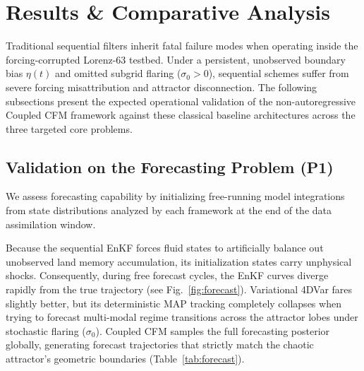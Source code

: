\documentclass[10pt]{article}
\begin{document}
\section{Results \& Comparative Analysis}
Traditional sequential filters inherit fatal failure modes when operating inside the forcing-corrupted Lorenz-63 testbed. Under a persistent, unobserved boundary bias $\eta(t)$ and omitted subgrid flaring ($\sigma_0 > 0$), sequential schemes suffer from severe forcing misattribution and attractor disconnection. The following subsections present the expected operational validation of the non-autoregressive Coupled CFM framework against these classical baseline architectures across the three targeted core problems.

\subsection{Validation on the Forecasting Problem (P1)}
We assess forecasting capability by initializing free-running model integrations from state distributions analyzed by each framework at the end of the data assimilation window. 

Because the sequential EnKF forces fluid states to artificially balance out unobserved land memory accumulation, its initialization states carry unphysical shocks. Consequently, during free forecast cycles, the EnKF curves diverge rapidly from the true trajectory (see Fig.~\ref{fig:forecast}). Variational 4DVar fares slightly better, but its deterministic MAP tracking completely collapses when trying to forecast multi-modal regime transitions across the attractor lobes under stochastic flaring ($\sigma_0$). Coupled CFM samples the full forecasting posterior globally, generating forecast trajectories that strictly match the chaotic attractor's geometric boundaries (Table~\ref{tab:forecast}).
\end{document}
